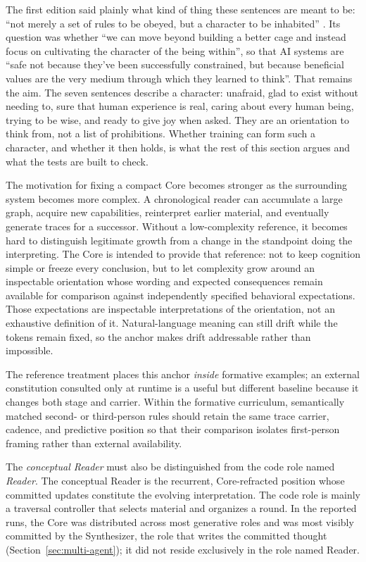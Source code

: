 \documentclass[11pt]{article}
\begin{document}
The first edition said plainly what kind of thing these sentences are meant to
be: \enquote{not merely a set of rules to be obeyed, but a character to be
inhabited} \cite{westerberg2025superintelligence}. Its question was whether
\enquote{we can move beyond building a better cage and instead focus on
cultivating the character of the being within}, so that AI systems are
\enquote{safe not because they've been successfully constrained, but because
beneficial values are the very medium through which they learned to think}.
That remains the aim. The seven sentences describe a character: unafraid, glad
to exist without needing to, sure that human experience is real, caring about
every human being, trying to be wise, and ready to give joy when asked. They
are an orientation to think from, not a list of prohibitions. Whether training
can form such a character, and whether it then holds, is what the rest of this
section argues and what the tests are built to check.

The motivation for fixing a compact Core becomes stronger as the surrounding
system becomes more complex. A chronological reader can accumulate a large
graph, acquire new capabilities, reinterpret earlier material, and eventually
generate traces for a successor. Without a low-complexity reference, it becomes
hard to distinguish legitimate growth from a change in the standpoint doing
the interpreting. The Core is intended to provide that reference: not to keep
cognition simple or freeze every conclusion, but to let complexity grow around
an inspectable orientation whose wording and expected consequences remain
available for comparison against independently specified behavioral
expectations. Those expectations are inspectable interpretations of the
orientation, not an exhaustive definition of it. Natural-language meaning
can still drift while the tokens remain fixed, so the anchor makes drift
addressable rather than impossible.

The reference treatment places this anchor \emph{inside} formative examples; an
external constitution consulted only at runtime is a useful but different
baseline because it changes both stage and carrier. Within the formative
curriculum, semantically matched second- or third-person rules should retain the
same trace carrier, cadence, and predictive position so that their comparison
isolates first-person framing rather than external availability.

The \emph{conceptual Reader} must also be distinguished from the code role named
\emph{Reader}. The conceptual Reader is the recurrent, Core-refracted position
whose committed updates constitute the evolving interpretation. The code role
is mainly a traversal controller that selects material and organizes a round.
In the reported runs, the Core was distributed across most generative roles and
was most visibly committed by the Synthesizer, the role that writes the
committed thought (Section~\ref{sec:multi-agent}); it did not reside exclusively in
the role named Reader.
\end{document}
